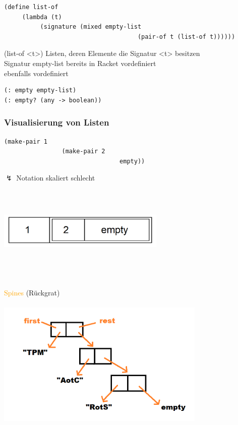 \documentclass[paper=a4, fontsize=11pt]{scrartcl}
\numberwithin{equation}{section}
\numberwithin{figure}{section}
\numberwithin{table}{section}
\begin{document}
\begin{lstlistig}
\begin{lstlisting}
(define list-of
     (lambda (t)
          (signature (mixed empty-list
                                     (pair-of t (list-of t))))))
\end{lstlisting}

(list-of <t>) Listen, deren Elemente die Signatur <t> besitzen \\
Signatur empty-list bereits in Racket vordefiniert \\
ebenfalls vordefiniert
\begin{lstlisting}
(: empty empty-list)
(: empty? (any -> boolean))
\end{lstlisting}
\subsubsection{Visualisierung von Listen}
\begin{lstlisting}
(make-pair 1
                (make-pair 2
                                empty))
\end{lstlisting}

$\lightning$ Notation skaliert schlecht \\
\includegraphics[width=8cm,height=5cm]{Listen.png}

\textcolor{orange}{Spines} (Rückgrat) \\
\includegraphics[width=10cm,height=7cm]{spine1.png}

\end{lstlistig}
\end{document}
